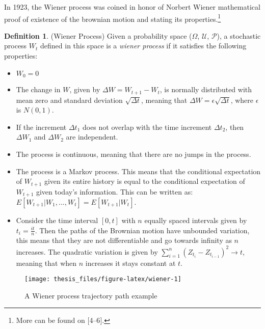 \documentclass[12pt,twoside]{reedthesis}
\theoremstyle{definition}
\newtheorem{definition}{Definition}[section]
\theoremstyle{definition}
\theoremstyle{remark}
\begin{document}
  In 1923, the Wiener process was coined in honor of Norbert Wiener
  mathematical proof of existence of the brownian motion and stating its
  properties.\footnote{More can be found on {[}4--6{]}.}
  \begin{definition}{(Wiener Process)} Given a probability space ($\Omega$, $\mathcal {U}$, $\mathcal {P}$), a stochastic process $W_t$ defined in this space is a \textit{wiener process} if it satisfies the following properties:
  \begin{itemize}
    \item  $W_{0}=0$
    
    \item The change in $W$, given by $\Delta W = W_{t+1}-W_{t}$, is normally distributed with mean zero and standard deviation $\sqrt{\Delta t}$, meaning that $\Delta W = \epsilon\sqrt{\Delta t}$, where $\epsilon$ is $N(0,1)$.
    
    \item If the increment $\Delta t_1$ does not overlap with the time increment $\Delta t_2$, then $\Delta W_1$ and $\Delta W_2$ are independent.
    
    \item The process is continuous, meaning that there are no jumps in the process.
    
    \item The process is a Markov process. This means that the conditional expectation of $W_{t+1}$ given its entire history is equal to the conditional expectation of $W_{t+1}$ given today's information. This can be written as: $E[W_{t+1}|W_1, ..., W_t] = E[W_{t+1}|W_t]$.
    
    \item Consider the time interval $[0,t]$ with $n$ equally spaced intervals given by $t_i = \frac{it}{n}$. Then the paths of the Brownian motion have unbounded variation, this means that they are not differentiable and go towards infinity as $n$ increases. The quadratic variation is given by $\sum_{i=1}^{n}{(Z_{t_i}-Z_{t_{i-1}})^2} \rightarrow t$, meaning that when $n$ increases it stays constant at $t$. 
  
  \end{itemize}
  \end{definition}
  \begin{figure}
  
  {\centering \texttt{[image: thesis\_files/figure-latex/wiener-1]} 
  
  }
  
  \caption{A Wiener process trajectory path example \label{wiener}}\label{fig:wiener}
  \end{figure}
\end{document}
